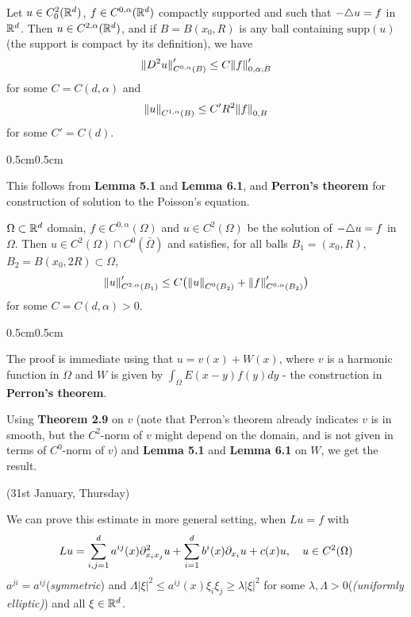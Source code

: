 \documentclass[12pt,a4paper]{article}
\newenvironment{proof}
{\begin{changemargin}{0.5cm}{0.5cm} 
	}%
	{\end{changemargin}
}
\newenvironment{p}
{\begin{proof} 
	}%
	{\end{proof}
}
\begin{document}
 Let $u\in C^2_0(\mathbb{R}^d)$, $f\in C^{0, \alpha}(\mathbb{R}^d)$ compactly supported and such that $-\triangle u = f$ in $\mathbb{R}^d$. Then $u\in C^{2, \alpha}(\mathbb{R}^d)$, and if $B= B(x_0, R)$ is any ball containing $\text{supp}(u)$ (the support is compact by its definition), we have
\begin{align*}
\snorms{D^2 u}{C^{0, \alpha}(B)}' \leq C \snorms{f}{0, \alpha, B}'
\end{align*}
for some $C =C(d, \alpha)$ and
\begin{align*}
\snorms{u}{C^{1,\alpha}(B)}\leq C' R^2 \snorms{f}{0, B}
\end{align*}
for some $C' = C(d)$.
\begin{p}
\pf This follows from \textbf{Lemma 5.1} and \textbf{Lemma 6.1}, and \textbf{Perron's theorem} for construction of solution to the Poisson's equation.

\eop
\end{p}
\s

 $\Omega \subset \mathbb{R}^d$ domain, $f\in C^{0, \alpha}(\Omega)$ and $u\in C^2(\Omega)$ be the solution of $-\triangle u =f$ in $\Omega$. Then $u\in C^2(\Omega) \cap C^0(\bar{\Omega})$ and satisfies, for all balls $B_1 = (x_0, R)$, $B_2= B(x_0, 2R) \subset \Omega$,
\begin{align*}
\snorms{u}{C^{2, \alpha}(B_1)}' \leq C \big(\snorms{u}{C^0(B_2)} + \snorms{f}{C^{0,\alpha}(B_2)}' \big) 
\end{align*}
for some $C =C(d, \alpha)>0$.
\begin{p}
\pf The proof is immediate using that $u= v(x) + W(x)$, where $v$ is a harmonic function in $\Omega$ and $W$ is given by $\int_{\Omega} E(x-y)f(y)dy$ - the construction in \textbf{Perron's theorem}.

\quad Using \textbf{Theorem 2.9} on $v$ (note that Perron's theorem already indicates $v$ is in smooth, but the $C^2$-norm of $v$ might depend on the domain, and is not given in terms of $C^0$-norm of $v$) and \textbf{Lemma 5.1} and \textbf{Lemma 6.1} on $W$, we get the result.

\eop
\end{p}
\s

\newday

(31st January, Thursday)
\s


We can prove this estimate in more general setting, when $Lu =f$ with
\begin{align*}
Lu = \sum_{i,j=1}^d a^{ij}(x) \partial^2_{x_i x_j} u + \sum_{i=1}^d b^i(x) \partial_{x_i} u + c(x)u, \quad u\in C^2(\Omega)
\end{align*}
$a^{ji} = a^{ij}$(\emph{symmetric}) and $\Lambda |\xi|^2 \leq a^{ij}(x) \xi_i \xi_j \geq \lambda |\xi|^2$ for some $\lambda, \Lambda >0$(\emph{(uniformly elliptic)}) and all $\xi \in \mathbb{R}^d$.
\s
\end{document}
